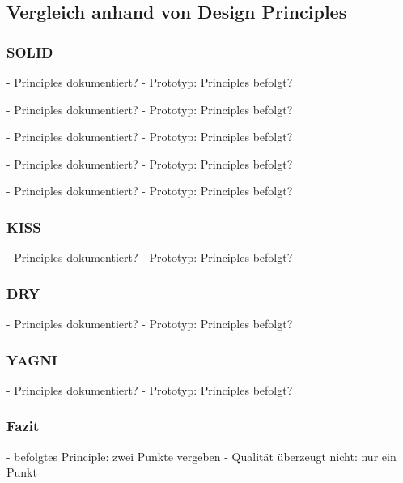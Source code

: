 \color{red}

\subsection{Vergleich anhand von Design Principles}

\subsubsection{SOLID}
- Principles dokumentiert?
- Prototyp: Principles befolgt?

- Principles dokumentiert?
- Prototyp: Principles befolgt?

- Principles dokumentiert?
- Prototyp: Principles befolgt?

- Principles dokumentiert?
- Prototyp: Principles befolgt?

- Principles dokumentiert?
- Prototyp: Principles befolgt?

\subsubsection{KISS}
- Principles dokumentiert?
- Prototyp: Principles befolgt?

\subsubsection{DRY}
- Principles dokumentiert?
- Prototyp: Principles befolgt?

\subsubsection{YAGNI}
- Principles dokumentiert?
- Prototyp: Principles befolgt?

\subsubsection{Fazit}
- befolgtes Principle: zwei Punkte vergeben
- Qualität überzeugt nicht: nur ein Punkt

\color{black}
